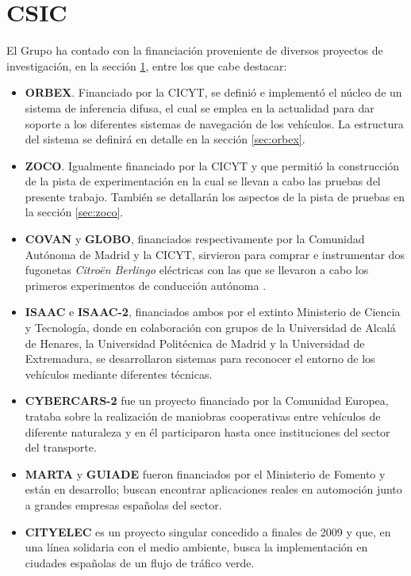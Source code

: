 \chapter{CSIC}
\label{ape:csic}


El Grupo ha contado con la financiación proveniente de diversos proyectos de investigación, en la sección \ref{ape:csic}, entre los que cabe destacar:

\begin{itemize}
	
	\item \textbf{\gls{ORBEX}}. Financiado por la CICYT, se definió e implementó el núcleo de un sistema de inferencia difusa, el cual se emplea en la actualidad para dar soporte a los diferentes sistemas de navegación de los vehículos. La estructura del sistema se definirá en detalle en la sección \ref{sec:orbex}.
	
	\item \textbf{\gls{ZOCO}}. Igualmente financiado por la CICYT y que permitió la construcción de la pista de experimentación en la cual se llevan a cabo las pruebas del presente trabajo. También se detallarán los aspectos de la pista de pruebas en la sección \ref{sec:zoco}.
	
	\item \textbf{COVAN} y \textbf{GLOBO}, financiados respectivamente por la Comunidad Autónoma de Madrid y la CICYT, sirvieron para comprar e instrumentar dos fugonetas \textit{Citroën Berlingo} eléctricas con las que se llevaron a cabo los primeros experimentos de conducción autónoma \cite{Alcalde2000}.
	
	\item \textbf{ISAAC} e \textbf{ISAAC-2}, financiados ambos por el extinto Ministerio de Ciencia y Tecnología, donde en colaboración con grupos de la Universidad de Alcalá de Henares, la Universidad Politécnica de Madrid y la Universidad de Extremadura, se desarrollaron sistemas para reconocer el entorno de los vehículos mediante diferentes técnicas.
	
	\item \textbf{CYBERCARS-2} fue un proyecto financiado por la Comunidad Europea, trataba sobre la realización de maniobras cooperativas entre vehículos de diferente naturaleza y en él participaron hasta once instituciones del sector del transporte.
	
	\item \textbf{MARTA} y \textbf{GUIADE} fueron financiados por el Ministerio de Fomento y están en desarrollo; buscan encontrar aplicaciones reales en automoción junto a grandes empresas españolas del sector.
	
	\item \textbf{CITYELEC} es un proyecto singular concedido a finales de 2009 y que, en una línea solidaria con el medio ambiente, busca la implementación en ciudades españolas de un flujo de tráfico verde.
	
\end{itemize}